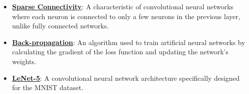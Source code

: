 \documentclass{article}%
\begin{document}
\begin{itemize}[leftmargin=*]
\item \href{https://purdue.brightspace.com/d2l/common/assets/pdfjs-d2l-dist/1.0.14-legacy/web/viewer.html?file=\%2Fcontent\%2Fenforced\%2F1095467-wl.202510.CS.24300.001\%2F09L1-cnn.pdf\%3Fou\%3D1095467\&lang=en-us\&container=d2l-fileviewer-rendered-pdf\&fullscreen=d2l-fileviewer-rendered-pdf-dialog\&height=667#page=10}{\textbf{Sparse Connectivity}}: A characteristic of convolutional neural networks where each neuron is connected to only a few neurons in the previous layer, unlike fully connected networks.%
\item \href{https://purdue.brightspace.com/d2l/common/assets/pdfjs-d2l-dist/1.0.14-legacy/web/viewer.html?file=\%2Fcontent\%2Fenforced\%2F1095467-wl.202510.CS.24300.001\%2F09L1-cnn.pdf\%3Fou\%3D1095467\&lang=en-us\&container=d2l-fileviewer-rendered-pdf\&fullscreen=d2l-fileviewer-rendered-pdf-dialog\&height=667#page=16}{\textbf{Back-propagation}}: An algorithm used to train artificial neural networks by calculating the gradient of the loss function and updating the network's weights.%
\item \href{https://purdue.brightspace.com/d2l/common/assets/pdfjs-d2l-dist/1.0.14-legacy/web/viewer.html?file=\%2Fcontent\%2Fenforced\%2F1095467-wl.202510.CS.24300.001\%2F09L1-cnn.pdf\%3Fou\%3D1095467\&lang=en-us\&container=d2l-fileviewer-rendered-pdf\&fullscreen=d2l-fileviewer-rendered-pdf-dialog\&height=667#page=22}{\textbf{LeNet-5}}: A convolutional neural network architecture specifically designed for the MNIST dataset.%
\end{itemize}

%
\end{document}
